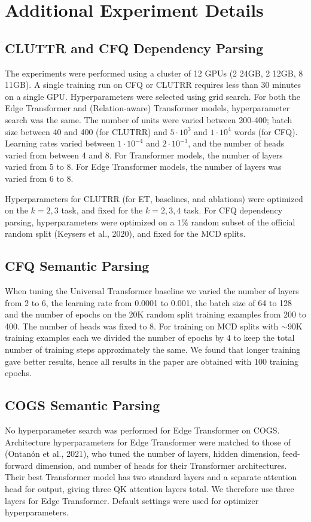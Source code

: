 \section{Additional Experiment Details}
\label{sec:hpsearch}

\subsection{CLUTTR and CFQ Dependency Parsing}
\label{sec:cluttr_and_cfqdep_hpsearch}
The experiments were performed using a cluster of 12 GPUs (2 24GB, 2
12GB, 8 11GB). A single training run on CFQ or CLUTRR requires less
than 30 minutes on a single GPU. Hyperparameters were selected using
grid search. For both the Edge Transformer and (Relation-aware)
Transformer models, hyperparameter search was the same. The number of units
were varied between 200-400; batch size between 40 and 400 (for
CLUTRR) and $5\cdot 10^3$ and $1 \cdot 10^4$ words (for CFQ).
Learning rates varied between $1\cdot10^{-4}$ and $2 \cdot
10^{-3}$, and the number of heads varied from
between 4 and 8. For Transformer models, the number of layers varied from 5 to 8. For
Edge Transformer models, the number of layers was varied from 6 to 8.%

Hyperparameters for CLUTRR (for ET, baselines, and ablations) were optimized on the $k=2,3$ task, and fixed for the $k=2,3,4$ task. For CFQ dependency parsing, hyperparameters were optimized on a $1\%$ random subset of the official random split (Keysers et al., 2020), and fixed for the MCD splits. 

\subsection{CFQ Semantic Parsing}
\label{sec:cfqsem_hpsearch}
When tuning the Universal Transformer baseline we varied the number of layers from 2 to 6, the learning rate from 0.0001 to 0.001, the batch size of 64 to 128 and the number of epochs on the 20K random split training examples from 200 to 400. The number of heads was fixed to 8. For training on MCD splits with $\sim$90K training examples each we divided the number of epochs by 4 to keep the total number of training steps approximately the same. We found that longer training gave better results, hence all results in the paper are obtained with 100 training epochs.

\subsection{COGS Semantic Parsing}
\label{sec:cogs_hpsearch}
No hyperparameter search was performed for Edge Transformer on COGS. Architecture hyperparameters for Edge Transformer were matched to those of (Ontanón et al., 2021), who tuned the number of
  layers, hidden dimension, feed-forward dimension, and number of
  heads for their Transformer architectures. Their best Transformer model has two standard layers and a separate attention head for output, giving three QK attention layers total. We therefore use three layers for Edge Transformer. Default settings were used for optimizer hyperparameters. 


